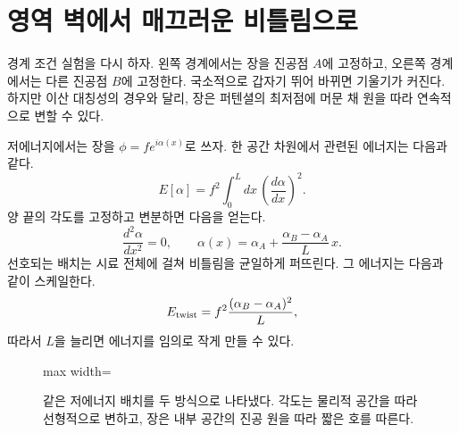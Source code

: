 \section{영역 벽에서 매끄러운 비틀림으로}

경계 조건 실험을 다시 하자. 왼쪽 경계에서는 장을 진공점 \(A\)에 고정하고, 오른쪽 경계에서는 다른 진공점 \(B\)에 고정한다. 국소적으로 갑자기 뛰어 바뀌면 기울기가 커진다. 하지만 이산 대칭성의 경우와 달리, 장은 퍼텐셜의 최저점에 머문 채 원을 따라 연속적으로 변할 수 있다.

저에너지에서는 장을 \(\phi=f e^{i\alpha(x)}\)로 쓰자. 한 공간 차원에서 관련된 에너지는 다음과 같다.
\begin{equation}
  E[\alpha]
  =f^2\int_0^L dx\,\left(\frac{d\alpha}{dx}\right)^2.
  \label{eq:l07-angle-functional}
\end{equation}
양 끝의 각도를 고정하고 변분하면 다음을 얻는다.
\begin{equation}
  \frac{d^2\alpha}{dx^2}=0,
  \qquad
  \alpha(x)=\alpha_A+
    \frac{\alpha_B-\alpha_A}{L}\,x.
  \label{eq:l07-linear-twist}
\end{equation}
선호되는 배치는 시료 전체에 걸쳐 비틀림을 균일하게 퍼뜨린다. 그 에너지는 다음과 같이 스케일한다.
\begin{equation}
  E_{\rm twist}
  =f^2\frac{(\alpha_B-\alpha_A)^2}{L},
  \label{eq:l07-twist-energy}
\end{equation}
따라서 \(L\)을 늘리면 에너지를 임의로 작게 만들 수 있다.

\begin{figure}[htbp]
\centering
\begin{adjustbox}{max width=\linewidth}
\end{adjustbox}
\caption{같은 저에너지 배치를 두 방식으로 나타냈다. 각도는 물리적 공간을 따라 선형적으로 변하고, 장은 내부 공간의 진공 원을 따라 짧은 호를 따른다.}
\end{figure}

